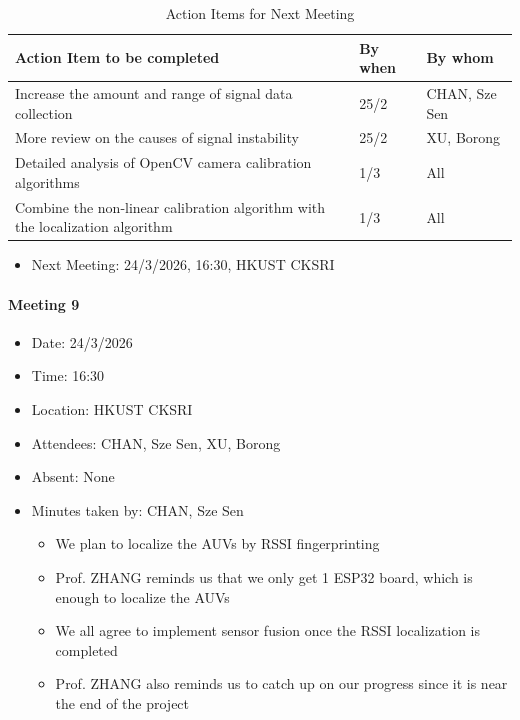 \documentclass[11pt]{article}
\begin{document}
    \begin{longtable}[c]{|l|l|l|}
        \caption{Action Items for Next Meeting}\\
        \hline
        \textbf{Action Item to be completed} & \textbf{By when} & \textbf{By whom} \\
        \hline
        \endhead
        Increase the amount and range of signal data collection & 25/2 & CHAN, Sze Sen \\
        \hline
        More review on the causes of signal instability & 25/2 & XU, Borong \\
        \hline
        Detailed analysis of OpenCV camera calibration algorithms & 1/3 & All \\
        \hline
        Combine the non-linear calibration algorithm with the localization algorithm & 1/3 & All \\
        \hline
    \end{longtable}
    
    \begin{itemize}
        \item Next Meeting: 24/3/2026, 16:30, HKUST CKSRI
    \end{itemize}
    \newpage
    \paragraph{Meeting 9}
    \begin{itemize}
        \item Date: 24/3/2026
        \item Time: 16:30
        \item Location: HKUST CKSRI
        \item Attendees: CHAN, Sze Sen, XU, Borong
        \item Absent: None
        \item Minutes taken by: CHAN, Sze Sen
        \begin{itemize}
            \item We plan to localize the AUVs by RSSI fingerprinting
            \item Prof. ZHANG reminds us that we only get 1 ESP32 board, which is enough to localize the AUVs
            \item We all agree to implement sensor fusion once the RSSI localization is completed
            \item Prof. ZHANG also reminds us to catch up on our progress since it is near the end of the project
        \end{itemize}
    \end{itemize}
    
\end{document}
